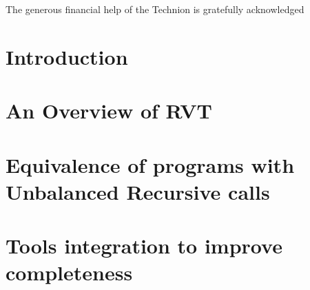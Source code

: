 \documentclass[12pt]{report}
\begin{document}
The generous financial help of the Technion is gratefully acknowledged

\tableofcontents

\chapter{Introduction}


\chapter{An Overview of RVT}


\chapter{Equivalence of programs with Unbalanced Recursive calls}
\label{chptr:rec}


\chapter{Tools integration to improve completeness}
\label{chptr:integ}


  

\end{document}
